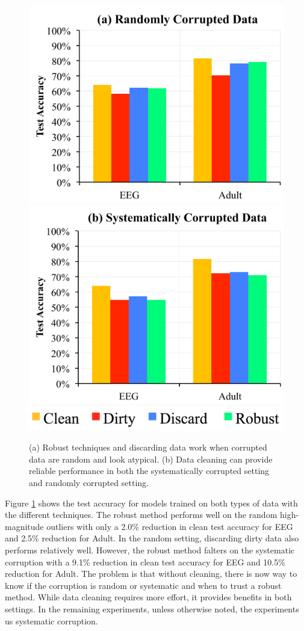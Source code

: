 \begin{figure}[ht!]
\centering
 \includegraphics[width=0.49\columnwidth]{exp/exp2.pdf}
 \includegraphics[width=0.49\columnwidth]{exp/exp1.pdf}
 \includegraphics[width=0.5\columnwidth]{exp/legend-1.png}\vspace{-1em}
 \caption{(a) Robust techniques and discarding data work when corrupted data are random and look atypical. (b) Data cleaning can provide reliable performance in both the systematically corrupted setting and randomly corrupted setting.\label{sys-rand}}
\end{figure}

Figure \ref{sys-rand} shows the test accuracy for models trained on both types of data with the different techniques.
The robust method performs well on the random high-magnitude outliers with only a 2.0\% reduction in clean test accuracy for EEG and 2.5\% reduction for Adult.
In the random setting, discarding dirty data also performs relatively well.
However, the robust method falters on the systematic corruption with a 9.1\% reduction in clean test accuracy for EEG and 10.5\% reduction for Adult.
The problem is that without cleaning, there is now way to know if the corruption is random or systematic and when to trust a robust method.
While data cleaning requires more effort, it provides benefits in both settings.
In the remaining experiments, unless otherwise noted, the experiments us systematic corruption.

